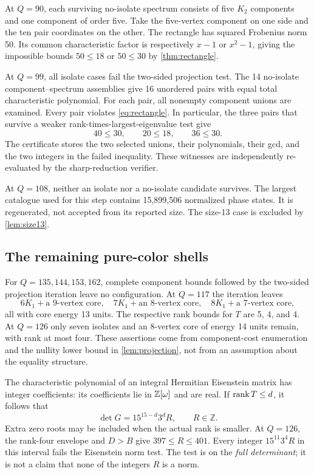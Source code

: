 At $Q=90$, each surviving no-isolate spectrum consists of five $K_2$ components and one component of order five. Take the five-vertex component on one side and the ten pair coordinates on the other. The rectangle has squared Frobenius norm 50. Its common characteristic factor is respectively $x-1$ or $x^2-1$, giving the impossible bounds $50\le18$ or $50\le30$ by \cref{thm:rectangle}.

At $Q=99$, all isolate cases fail the two-sided projection test. The 14 no-isolate component--spectrum assemblies give 16 unordered pairs with equal total characteristic polynomial. For each pair, all nonempty component unions are examined. Every pair violates \eqref{eq:rectangle}. In particular, the three pairs that survive a weaker rank-times-largest-eigenvalue test give
\[
 40\le30,\qquad20\le18,\qquad36\le30.
\]
The certificate stores the two selected unions, their polynomials, their gcd, and the two integers in the failed inequality. These witnesses are independently re-evaluated by the sharp-reduction verifier.

At $Q=108$, neither an isolate nor a no-isolate candidate survives. The largest catalogue used for this step contains 15,899,506 normalized phase states. It is regenerated, not accepted from its reported size. The size-13 case is excluded by \cref{lem:size13}.

\subsection{The remaining pure-color shells}
For $Q=135,144,153,162$, complete component bounds followed by the two-sided projection iteration leave no configuration. At $Q=117$ the iteration leaves
\[
 6K_1+\text{a 9-vertex core},\quad
 7K_1+\text{an 8-vertex core},\quad
 8K_1+\text{a 7-vertex core},
\]
all with core energy 13 units. The respective rank bounds for $T$ are 5, 4, and 4. At $Q=126$ only seven isolates and an 8-vertex core of energy 14 units remain, with rank at most four. These assertions come from component-cost enumeration and the nullity lower bound in \cref{lem:projection}, not from an assumption about the equality structure.

The characteristic polynomial of an integral Hermitian Eisenstein matrix has integer coefficients: its coefficients lie in $\mathbb Z[\omega]$ and are real. If $\operatorname{rank} T\le d$, it follows that
\begin{equation}\label{eq:lattice}
 \det G=15^{15-d}3^dR,\qquad R\in\mathbb Z.
\end{equation}
Extra zero roots may be included when the actual rank is smaller. At $Q=126$, the rank-four envelope and $D>B$ give $397\le R\le401$. Every integer $15^{11}3^4R$ in this interval fails the Eisenstein norm test. The test is on the \emph{full determinant}; it is not a claim that none of the integers $R$ is a norm.

